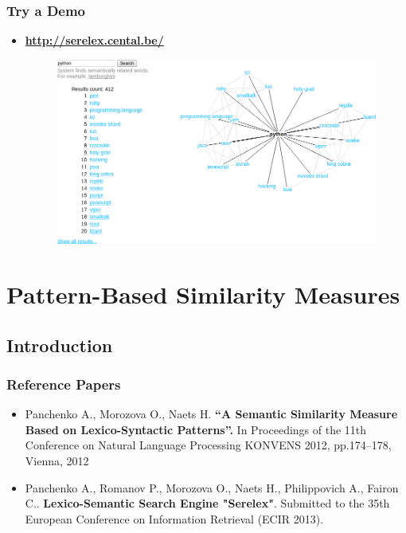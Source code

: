 \documentclass{beamer}
\begin{document}
\begin{frame}
\frametitle{Try a Demo}

\begin{itemize}
  \item {\bf \url{http://serelex.cental.be/} }
  
\begin{figure}	
	\centering
		\includegraphics[width=1.0\textwidth]{figures/python}
		\end{figure}
\end{itemize}

\end{frame}

\section{Pattern-Based Similarity Measures}
\subsection{Introduction}

\begin{frame}
\frametitle{Reference Papers}

\begin{itemize}
\item Panchenko A., Morozova O., Naets H. \textbf{“A Semantic Similarity Measure Based on Lexico-Syntactic Patterns''.} In Proceedings of the 11th Conference on Natural Language Processing KONVENS 2012, pp.174--178, Vienna, 2012
\item Panchenko A., Romanov P., Morozova O., Naets H., Philippovich A., Fairon C.. \textbf{Lexico-Semantic Search Engine "Serelex"}. Submitted to the 35th European Conference on Information Retrieval (ECIR 2013).
\end{itemize}
\end{frame}
\end{document}
